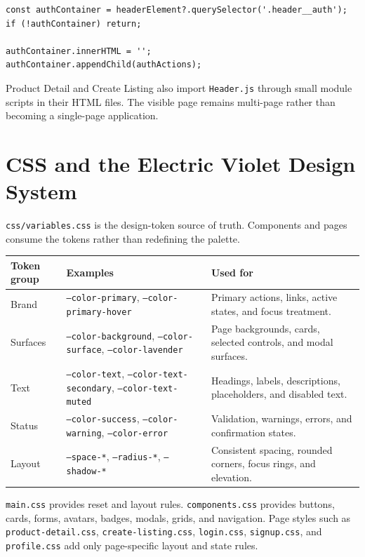 \documentclass[10pt]{article}
\newcommand{\code}[1]{\texttt{#1}}
\begin{document}
\begin{lstlisting}
const authContainer = headerElement?.querySelector('.header__auth');
if (!authContainer) return;

authContainer.innerHTML = '';
authContainer.appendChild(authActions);
\end{lstlisting}

Product Detail and Create Listing also import \code{Header.js} through small module scripts in their HTML files. The visible page remains multi-page rather than becoming a single-page application.

\section{CSS and the Electric Violet Design System}

\code{css/variables.css} is the design-token source of truth. Components and pages consume the tokens rather than redefining the palette.

\begin{tabular}{@{}p{3.0cm}p{3.2cm}p{7.1cm}@{}}
\toprule
\textbf{Token group} & \textbf{Examples} & \textbf{Used for} \\
\midrule
Brand & \code{--color-primary}, \code{--color-primary-hover} & Primary actions, links, active states, and focus treatment. \\
Surfaces & \code{--color-background}, \code{--color-surface}, \code{--color-lavender} & Page backgrounds, cards, selected controls, and modal surfaces. \\
Text & \code{--color-text}, \code{--color-text-secondary}, \code{--color-text-muted} & Headings, labels, descriptions, placeholders, and disabled text. \\
Status & \code{--color-success}, \code{--color-warning}, \code{--color-error} & Validation, warnings, errors, and confirmation states. \\
Layout & \code{--space-*}, \code{--radius-*}, \code{--shadow-*} & Consistent spacing, rounded corners, focus rings, and elevation. \\
\bottomrule
\end{tabular}

\code{main.css} provides reset and layout rules. \code{components.css} provides buttons, cards, forms, avatars, badges, modals, grids, and navigation. Page styles such as \code{product-detail.css}, \code{create-listing.css}, \code{login.css}, \code{signup.css}, and \code{profile.css} add only page-specific layout and state rules.
\end{document}

